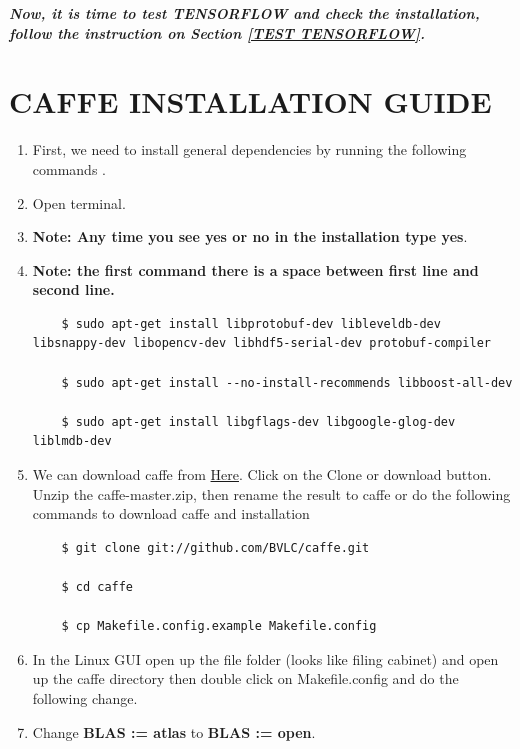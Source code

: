\documentclass[12pt]{article}
\begin{document}
\textbf{\emph{Now, it is time to test TENSORFLOW and check the installation, follow the instruction on Section \ref{TEST TENSORFLOW}.}}

\newpage
\section{CAFFE INSTALLATION GUIDE}

\begin{enumerate}
  \item First, we need to install general dependencies by running the following commands \cite{CAFFE}.
  \item Open terminal.
  \item \textbf{Note: Any time you see yes or no in the installation type yes}.
  \item \textbf{Note: the first command there is a space between first line and second line.}

\begin{lstlisting}
    $ sudo apt-get install libprotobuf-dev libleveldb-dev libsnappy-dev libopencv-dev libhdf5-serial-dev protobuf-compiler

    $ sudo apt-get install --no-install-recommends libboost-all-dev

    $ sudo apt-get install libgflags-dev libgoogle-glog-dev liblmdb-dev
\end{lstlisting}


  \item We can download caffe from  \href{https://github.com/BVLC/caffe}{Here}. Click on the Clone or download button. Unzip the caffe-master.zip, then rename the result to caffe or do the following commands to download caffe and installation


\begin{lstlisting}
    $ git clone git://github.com/BVLC/caffe.git

    $ cd caffe

    $ cp Makefile.config.example Makefile.config
\end{lstlisting}

  \item In the Linux GUI open up the file folder (looks like filing cabinet) and open up the caffe directory then double click on Makefile.config and do the following change.
  \item Change \textbf{BLAS := atlas} to \textbf{BLAS := open}.


\end{enumerate}
\end{document}
